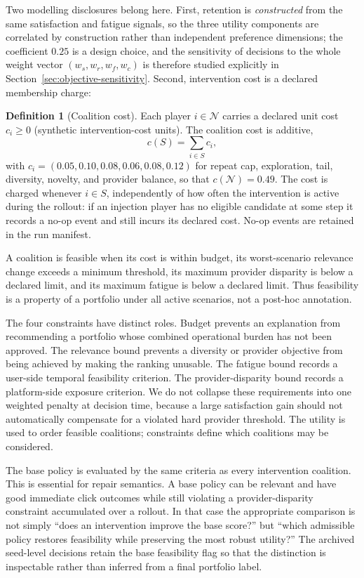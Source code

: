 \documentclass[review]{elsarticle}
\theoremstyle{plain}
\theoremstyle{definition}
\newtheorem{definition}{Definition}
\theoremstyle{remark}
\newcommand{\Players}{\mathcal{N}}
\begin{document}
Two modelling disclosures belong here. First, retention is \emph{constructed} from the same satisfaction and fatigue signals, so the three utility components are correlated by construction rather than independent preference dimensions; the coefficient $0.25$ is a design choice, and the sensitivity of decisions to the whole weight vector $(w_s,w_r,w_f,w_c)$ is therefore studied explicitly in Section~\ref{sec:objective-sensitivity}. Second, intervention cost is a declared membership charge:

\begin{definition}[Coalition cost]\label{def:cost}
Each player $i\in\Players$ carries a declared unit cost $c_i\geq0$ (synthetic intervention-cost units). The coalition cost is additive,
\begin{equation}
 c(S)=\sum_{i\in S}c_i,
\label{eq:cost}
\end{equation}
with $c_i=(0.05,0.10,0.08,0.06,0.08,0.12)$ for repeat cap, exploration, tail, diversity, novelty, and provider balance, so that $c(\Players)=0.49$. The cost is charged whenever $i\in S$, independently of how often the intervention is active during the rollout: if an injection player has no eligible candidate at some step it records a no-op event and still incurs its declared cost. No-op events are retained in the run manifest.
\end{definition}

A coalition is feasible when its cost is within budget, its worst-scenario relevance change exceeds a minimum threshold, its maximum provider disparity is below a declared limit, and its maximum fatigue is below a declared limit. Thus feasibility is a property of a portfolio under all active scenarios, not a post-hoc annotation.

The four constraints have distinct roles. Budget prevents an explanation from recommending a portfolio whose combined operational burden has not been approved. The relevance bound prevents a diversity or provider objective from being achieved by making the ranking unusable. The fatigue bound records a user-side temporal feasibility criterion. The provider-disparity bound records a platform-side exposure criterion. We do not collapse these requirements into one weighted penalty at decision time, because a large satisfaction gain should not automatically compensate for a violated hard provider threshold. The utility is used to order feasible coalitions; constraints define which coalitions may be considered.

The base policy is evaluated by the same criteria as every intervention coalition. This is essential for repair semantics. A base policy can be relevant and have good immediate click outcomes while still violating a provider-disparity constraint accumulated over a rollout. In that case the appropriate comparison is not simply ``does an intervention improve the base score?'' but ``which admissible policy restores feasibility while preserving the most robust utility?'' The archived seed-level decisions retain the base feasibility flag so that the distinction is inspectable rather than inferred from a final portfolio label.
\end{document}
